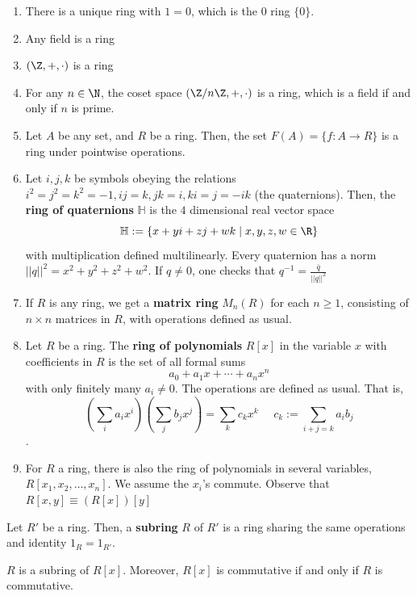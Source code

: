 \begin{ex}
    \begin{enumerate}
        \item There is a unique ring with $1=0$, which is the $0$ ring $\{0\}$.
        \item Any field is a ring
        \item $(\Z,+,\cdot)$ is a ring
        \item For any $n \in \N$, the coset space $(\Z/n\Z,+,\cdot)$ is a ring, which is a field if and only if $n$ is prime.
        \item Let $A$ be any set, and $R$ be a ring. Then, the set $F(A) = \{f:A \to R\}$ is a ring under pointwise operations.
        \item Let $i,j,k$ be symbols obeying the relations $i^2=j^2=k^2=-1,ij=k,jk=i,ki=j=-ik$ (the quaternions). Then, the \textbf{ring of quaternions} $\mathbb H$ is the $4$ dimensional real vector space
        $$\mathbb H:= \{x+yi+zj+wk \mid x,y,z,w \in \R\}$$
        with multiplication defined multilinearly. Every quaternion has a norm $||q||^2=x^2+y^2+z^2+w^2$. If $q \neq 0$, one checks that $q^{-1}=\frac{\bar q}{||q||^2}$
        \item If $R$ is any ring, we get a \textbf{matrix ring} $M_n(R)$ for each $n \geq 1$, consisting of $n \times n$ matrices in $R$, with operations defined as usual.
        \item Let $R$ be a ring. The \textbf{ring of polynomials} $R[x]$ in the variable $x$ with coefficients in $R$ is the set of all formal sums
        $$a_0+a_1x+\cdots +a_nx^n$$
        with only finitely many $a_i \neq 0$. The operations are defined as usual. That is,
        $$(\sum_ia_ix^i)(\sum_jb_jx^j)=\sum_kc_kx^k\:\:\:\:\:\: c_k:=\sum_{i+j=k}a_ib_j$$.
        \item For $R$ a ring, there is also the ring of polynomials in several variables, $R[x_1,x_2,\dots,x_n]$. We assume the $x_i$'s commute. Observe that $R[x,y] \equiv (R[x])[y]$
    \end{enumerate}
\end{ex}

\begin{defn}
    Let $R'$ be a ring. Then, a \textbf{subring} $R$ of $R'$ is a ring sharing the same operations and identity $1_R=1_{R'}$.
\end{defn}

\begin{ex}
    $R$ is a subring of $R[x]$. Moreover, $R[x]$ is commutative if and only if $R$ is commutative.
\end{ex}

